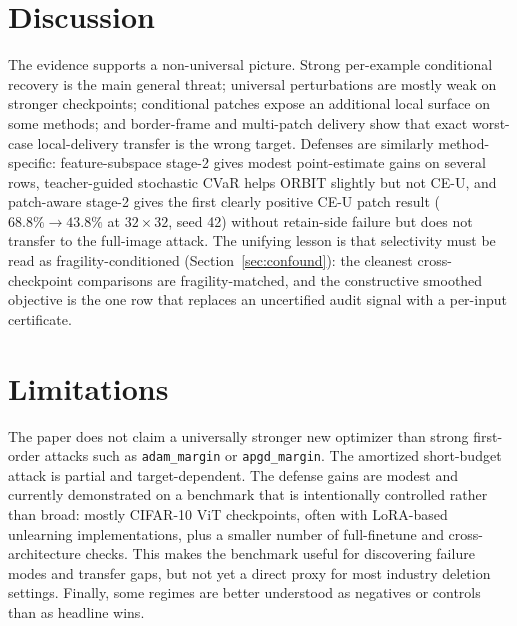 \documentclass[11pt]{article}
\begin{document}
\section{Discussion}
The evidence supports a non-universal picture. Strong per-example conditional recovery is the main general threat; universal perturbations are mostly weak on stronger checkpoints; conditional patches expose an additional local surface on some methods; and border-frame and multi-patch delivery show that exact worst-case local-delivery transfer is the wrong target. Defenses are similarly method-specific: feature-subspace stage-2 gives modest point-estimate gains on several rows, teacher-guided stochastic CVaR helps ORBIT slightly but not CE-U, and patch-aware stage-2 gives the first clearly positive CE-U patch result ($68.8\%\!\to\!43.8\%$ at $32\times32$, seed 42) without retain-side failure but does not transfer to the full-image attack. The unifying lesson is that selectivity must be read as fragility-conditioned (Section~\ref{sec:confound}): the cleanest cross-checkpoint comparisons are fragility-matched, and the constructive smoothed objective is the one row that replaces an uncertified audit signal with a per-input certificate.


\section{Limitations}
The paper does not claim a universally stronger new optimizer than strong first-order attacks such as \texttt{adam\_margin} or \texttt{apgd\_margin}. The amortized short-budget attack is partial and target-dependent. The defense gains are modest and currently demonstrated on a benchmark that is intentionally controlled rather than broad: mostly CIFAR-10 ViT checkpoints, often with LoRA-based unlearning implementations, plus a smaller number of full-finetune and cross-architecture checks. This makes the benchmark useful for discovering failure modes and transfer gaps, but not yet a direct proxy for most industry deletion settings. Finally, some regimes are better understood as negatives or controls than as headline wins.
\end{document}
